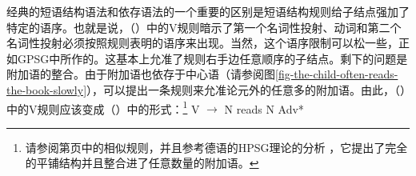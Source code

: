经典的短语结构语法和依存语法的一个重要的区别是短语结构规则给子结点强加了特定的语序。也就是说，（）中的V规则暗示了第一个名词性投射、动词和第二个名词性投射必须按照规则表明的语序来出现。当然，这个语序限制可以松一些，正如GPSG中所作的。这基本上允准了规则右手边任意顺序的子结点。剩下的问题是附加语的整合。由于附加语也依存于中心语（请参阅图\vref{fig-the-child-often-reads-the-book-slowly}），可以提出一条规则来允准论元外的任意多的附加语。由此，（）中的V规则应该变成（）中的形式：\footnote{%
请参阅第\pageref{adv-metarule}页中\gpsgc 的相似规则，并且参考德语的HPSG理论的分析 \citet{Kasper94a}，它提出了完全的平铺结构并且整合进了任意数量的附加语。
}
\ea
V $\to$ N reads N Adv*
\z 

